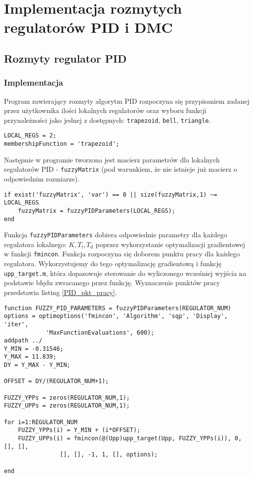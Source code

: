 \chapter{Implementacja rozmytych regulatorów PID i DMC}
\label{pro5}

\section{Rozmyty regulator PID}
\subsection{Implementacja}
Program zawierający rozmyty algorytm PID rozpoczyna się przypisaniem zadanej przez użytkownika ilości lokalnych regulatorów oraz wyboru funkcji przynależności jako jednej z dostępnych: \verb+trapezoid+, \verb+bell+, \verb+triangle+.

\begin{lstlisting}[style=custommatlab,frame=single]
LOCAL_REGS = 2;
membershipFunction = 'trapezoid'; 
\end{lstlisting}

Następnie w programie tworzona jest macierz parametrów dla lokalnych regulatorów PID - \verb+fuzzyMatrix+ (pod warunkiem, że nie istnieje już macierz o odpowiednim rozmiarze).

\begin{lstlisting}[style=custommatlab,frame=single]
if exist('fuzzyMatrix', 'var') == 0 || size(fuzzyMatrix,1) ~= LOCAL_REGS
    fuzzyMatrix = fuzzyPIDParameters(LOCAL_REGS);
end
\end{lstlisting}

Funkcja \verb+fuzzyPIDParameters+ dobiera odpowiednie parametry dla każdego regulatora lokalnego: $K, T_{\mathrm{i}}, T_{\mathrm{d}}$  poprzez wykorzystanie optymalizacji gradientowej w funkcji \verb+fmincon+. Funkcja rozpoczyna się doborem punktu pracy dla każdego regulatora. Wykorzystujemy do tego optymalizację gradientową i funkcję \verb+upp_target.m+, która dopasowuje sterowanie do wyliczonego wcześniej wyjścia na podstawie błędu zwracanego przez funkcję. Wyznaczenie punktów pracy przedstawia listing \ref{PID_pkt_pracy}. 
\\

\begin{lstlisting}[style=custommatlab,frame=single,label={PID_pkt_pracy},caption={Funkcja dobierająca punktów pracy},captionpos=b]
function FUZZY_PID_PARAMETERS = fuzzyPIDParameters(REGULATOR_NUM)
options = optimoptions('fmincon', 'Algorithm', 'sqp', 'Display', 'iter', 
			'MaxFunctionEvaluations', 600);
addpath ../ 
Y_MIN = -0.31546;
Y_MAX = 11.839;
DY = Y_MAX - Y_MIN;

OFFSET = DY/(REGULATOR_NUM+1);

FUZZY_YPPs = zeros(REGULATOR_NUM,1);
FUZZY_UPPs = zeros(REGULATOR_NUM,1);

for i=1:REGULATOR_NUM
    FUZZY_YPPs(i) = Y_MIN + (i*OFFSET);
    FUZZY_UPPs(i) = fmincon(@(Upp)upp_target(Upp, FUZZY_YPPs(i)), 0, [], [], 
    			[], [], -1, 1, [], options);

end
\end{lstlisting}

